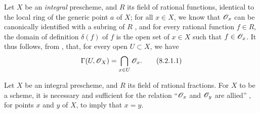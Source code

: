\begin{env}[8.2.1]
\label{1.8.2.1}
Let $X$ be an \emph{integral} prescheme, and $R$ its field of rational functions, identical to the local ring of the generic point $a$ of $X$;
for all $x\in X$, we know that $\mathscr{O}_x$ can be canonically identified with a subring of $R$ , and for every rational function $f\in R$, the domain of definition $\delta(f)$ of $f$ is the open set of $x\in X$ such that
$f\in\mathscr{O}_x$.
It thus follows, from , that, for every open $U\subset X$, we have
\[
\label{eq:1.8.2.1.1}
  \Gamma(U,\mathscr{O}_X)=\bigcap_{x\in U}\mathscr{O}_x.
  \tag{8.2.1.1}
\]
\end{env}

\begin{proposition}[8.2.2]
\label{1.8.2.2}
Let $X$ be an integral prescheme, and $R$ its field of rational fractions. For $X$ to be a scheme, it is necessary and sufficient for the relation ``$\mathscr{O}_x$ and $\mathscr{O}_y$ are allied'' , for points $x$ and $y$ of $X$, to imply that $x=y$.
\end{proposition}

